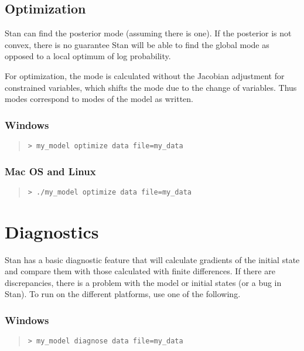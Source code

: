 \subsection{Optimization}

Stan can find the posterior mode (assuming there is one).  If the
posterior is not convex, there is no guarantee Stan will be able to
find the global mode as opposed to a local optimum of log probability.

For optimization, the mode is calculated without the Jacobian
adjustment for constrained variables, which shifts the mode due to the
change of variables.  Thus modes correspond to modes of the model as
written.  

\subsubsection{Windows}
%
\begin{quote}
\begin{Verbatim}[fontshape=sl]
> my_model optimize data file=my_data
\end{Verbatim}
\end{quote}

\subsubsection{Mac OS and Linux}
%
\begin{quote}
\begin{Verbatim}[fontshape=sl]
> ./my_model optimize data file=my_data
\end{Verbatim}
\end{quote}



\section{Diagnostics}\label{diagnostics.section}

Stan has a basic diagnostic feature that will calculate gradients of
the initial state and compare them with those calculated with finite
differences.  If there are discrepancies, there is a problem with the
model or initial states (or a bug in Stan).  To run on the different
platforms, use one of the following.

\subsubsection{Windows}
%
\begin{quote}
\begin{Verbatim}[fontshape=sl]
> my_model diagnose data file=my_data
\end{Verbatim}
\end{quote}

